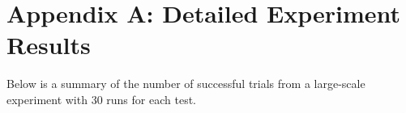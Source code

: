 \documentclass[11pt]{article}
\begin{document}
\appendix
\section{Appendix A: Detailed Experiment Results}
Below is a summary of the number of successful trials from a large-scale experiment with 30 runs for each test.

\tiny











\end{document}
